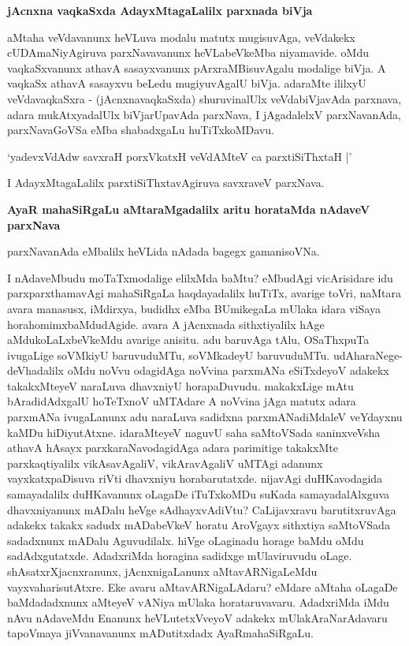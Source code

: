 \noindent
{\bf\large{jAcnxna vaqkaSxda AdayxMtagaLalilx parxnada biVja}}\label{page138}

aMtaha veVdavanunx heVLuva modalu matutx mugisuvAga, veVdakekx cUDAmaNiyAgiruva parxNavavanunx heVLabeVkeMba niyamavide. oMdu vaqkaSxvanunx athavA sasayxvanunx pArxraMBisuvAgalu modalige biVja. A vaqkaSx athavA sasayxvu beLedu mugiyuvAgalU biVja. adaraMte ililxyU veVdavaqkaSxra - (jAcnxnavaqkaSxda) shuruvinalUlx veVdabiVjavAda parxnava, adara mukAtxyadalUlx biVjarUpavAda parxNava, I jAgadalelxV parxNavanAda, parxNavaGoVSa eMba shabadxgaLu huTiTxkoMDavu.

\begin{shloka}
`yadevxVdAdw savxraH porxVkatxH veVdAMteV ca parxtiSiThxtaH |'\label{138}
\end{shloka}

I AdayxMtagaLalilx parxtiSiThxtavAgiruva savxraveV parxNava.

\noindent
{\bf\large{AyaR mahaSiRgaLu aMtaraMgadalilx aritu horataMda nAdaveV parxNava}}\label{page138}

parxNavanAda eMbalilx heVLida nAdada bagegx gamanisoVNa.

I nAdaveMbudu moTaTxmodalige elilxMda baMtu? eMbudAgi vicArisidare idu parxparxthamavAgi mahaSiRgaLa haqdayadalilx huTiTx, avarige toVri, naMtara avara manasusx, iMdirxya, budidhx eMba BUmikegaLa mUlaka idara viSaya horahomimxbaMdudAgide. avara A jAcnxnada sithxtiyalilx hAge aMdukoLaLxbeVkeMdu avarige anisitu. adu baruvAga tAlu, OSaThxpuTa ivugaLige soVMkiyU baruvuduMTu, soVMkadeyU baruvuduMTu. udAharaNege- deVhadalilx oMdu noVvu odagidAga noVvina parxmANa eSiTxdeyoV adakekx takakxMteyeV naraLuva dhavxniyU horapaDuvudu. makakxLige mAtu bAradidAdxgalU hoTeTxnoV uMTAdare A noVvina jAga matutx adara parxmANa ivugaLanunx adu naraLuva sadidxna parxmANadiMdaleV veYdayxnu kaMDu hiDiyutAtxne. idaraMteyeV naguvU saha saMtoVSada saninxveVsha athavA hAsayx parxkaraNavodagidAga adara parimitige takakxMte parxkaqtiyalilx vikAsavAgaliV, vikAravAgaliV uMTAgi adanunx vayxkatxpaDisuva riVti dhavxniyu horabarutatxde. nijavAgi duHKavodagida samayadalilx duHKavanunx oLagaDe iTuTxkoMDu suKada samayadalAlxguva dhavxniyanunx mADalu heVge sAdhayxvAdiVtu? CaLijavxravu barutitxruvAga adakekx takakx sadudx mADabeVkeV horatu AroVgayx sithxtiya saMtoVSada sadadxnunx mADalu Aguvudilalx. hiVge oLaginadu horage baMdu oMdu sadAdxgutatxde. AdadxriMda horagina sadidxge mUlaviruvudu oLage. shAsatxrXjacnxranunx, jAcnxnigaLanunx aMtavARNigaLeMdu vayxvaharisutAtxre. Eke avaru aMtavARNigaLAdaru? eMdare aMtaha oLagaDe baMdadadxnunx aMteyeV vANiya mUlaka horataruvavaru. AdadxriMda iMdu nAvu nAdaveMdu Enanunx heVLutetxVveyoV adakekx mUlakAraNarAdavaru tapoVmaya jiVvanavanunx mADutitxdadx AyaRmahaSiRgaLu.


